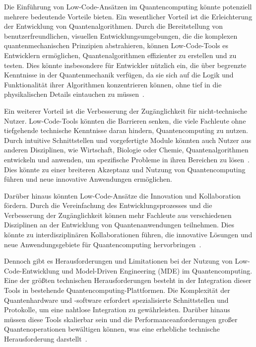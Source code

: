 Die Einführung von Low-Code-Ansätzen im Quantencomputing könnte potenziell mehrere bedeutende Vorteile bieten. 
Ein wesentlicher Vorteil ist die Erleichterung der Entwicklung von Quantenalgorithmen. Durch die 
Bereitstellung von benutzerfreundlichen, visuellen Entwicklungsumgebungen, die die komplexen 
quantenmechanischen Prinzipien abstrahieren, können Low-Code-Tools es Entwicklern ermöglichen, 
Quantenalgorithmen effizienter zu erstellen und zu testen. Dies könnte insbesondere für Entwickler nützlich 
ein, die über begrenzte Kenntnisse in der Quantenmechanik verfügen, da sie sich auf die Logik und 
Funktionalität ihrer Algorithmen konzentrieren können, ohne tief in die physikalischen Details 
eintauchen zu müssen~\cite{Cabot_2020}.

Ein weiterer Vorteil ist die Verbesserung der Zugänglichkeit für nicht-technische Nutzer. Low-Code-Tools 
könnten die Barrieren senken, die viele Fachleute ohne tiefgehende technische Kenntnisse daran hindern, 
Quantencomputing zu nutzen. Durch intuitive Schnittstellen und vorgefertigte Module könnten auch Nutzer 
aus anderen Disziplinen, wie Wirtschaft, Biologie oder Chemie, Quantenalgorithmen entwickeln und 
anwenden, um spezifische Probleme in ihren Bereichen zu lösen~\cite{di2022low}. Dies könnte zu 
einer breiteren Akzeptanz und Nutzung von Quantencomputing führen und neue innovative Anwendungen ermöglichen.

Darüber hinaus könnten Low-Code-Ansätze die Innovation und Kollaboration fördern. Durch die 
Vereinfachung des Entwicklungsprozesses und die Verbesserung der Zugänglichkeit können mehr Fachleute 
aus verschiedenen Disziplinen an der Entwicklung von Quantenanwendungen teilnehmen. Dies könnte zu 
interdisziplinären Kollaborationen führen, die innovative Lösungen und neue Anwendungsgebiete für 
Quantencomputing hervorbringen~\cite{di2022low}.

Dennoch gibt es Herausforderungen und Limitationen bei der Nutzung von Low-Code-Entwicklung und 
Model-Driven Engineering (MDE) im Quantencomputing. Eine der größten technischen Herausforderungen 
besteht in der Integration dieser Tools in bestehende Quantencomputing-Plattformen. Die Komplexität 
der Quantenhardware und -software erfordert spezialisierte Schnittstellen und Protokolle, um eine 
nahtlose Integration zu gewährleisten. Darüber hinaus müssen diese Tools skalierbar sein und die 
Performanceanforderungen großer Quantenoperationen bewältigen können, was eine erhebliche technische 
Herausforderung darstellt~\cite{monroe2013scaling}.

